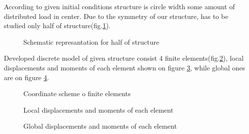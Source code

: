 According to given initial conditions structure is circle width some amount of distributed load in
center. Due to the symmetry of our structure, has to be studied only half of
structure(fig.\ref{fig:halfModel}).
\begin{figure}[H]
    \centering
        
    \caption{Schematic represantation for half of structure}\label{fig:halfModel}      
\end{figure}
Developed discrete model of given structure consist 4 finite elements(fig.\ref{fig:coords}), local
displacements and moments of each element shown on figure \ref{fig:localDispl}, while global ones
are on figure \ref{fig:globDispl}.
\begin{figure}[H]
    \centering
        
    \caption{Coordinate scheme o finite elements}\label{fig:coords}      
\end{figure}
\begin{figure}[H]
    \centering
        
    \caption{Local displacements and moments of each element}\label{fig:localDispl}      
\end{figure}
\begin{figure}[H]
    \centering
        
    \caption{Global displacements and moments of each element}\label{fig:globDispl}      
\end{figure}